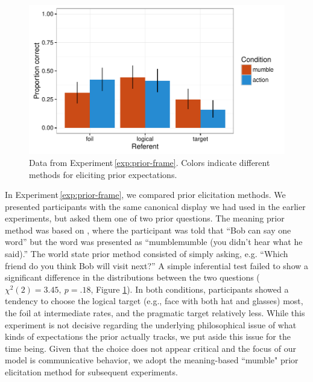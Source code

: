 \documentclass[man,noapacite]{apa2}
\newcounter{Experiment}
\newcommand{\exptref}[1]{Experiment\,\ref{#1}}
\begin{document}
\begin{figure}[t]
  \centering
  \includegraphics[width=5in]{../plots/2-prior-frame.pdf}
  \caption{\label{fig:prior-frame} Data from \exptref{exp:prior-frame}. Colors indicate different methods for eliciting prior expectations.}
\end{figure}

In \exptref{exp:prior-frame}, we compared prior elicitation methods. We presented participants with the same canonical display we had used in the earlier experiments, but asked them one of two prior questions. The meaning prior method was based on , where the participant was told that ``Bob can say one word'' but the word was presented as ``mumblemumble (you didn't hear what he said).'' The world state prior method consisted of simply asking, e.g. ``Which friend do you think Bob will visit next?'' A simple inferential test failed to show a significant difference in the distributions between the two questions ($\chi^2(2) = 3.45,~p = .18$, Figure \ref{fig:prior-frame}). In both conditions, participants showed a tendency to choose the logical target (e.g., face with both hat and glasses) most, the foil at intermediate rates, and the pragmatic target relatively less. While this experiment is not decisive regarding the underlying philosophical issue of what kinds of expectations the prior actually tracks, we put aside this issue for the time being. Given that the choice does not appear critical and the focus of our model is communicative behavior, we  adopt the meaning-based ``mumble" prior elicitation method for subsequent experiments.
\end{document}
